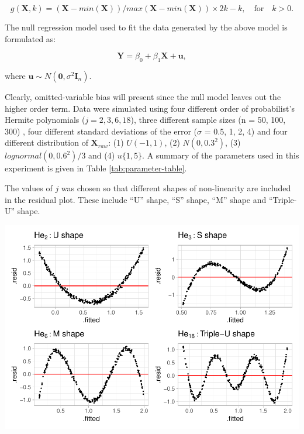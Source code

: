 \documentclass[]{interact}
\theoremstyle{plain}%
\theoremstyle{definition}
\theoremstyle{remark}
\begin{document}
\begin{equation} \label{eq:scaling-function}
g(\boldsymbol{X}, k) = (\boldsymbol{X} - min(\boldsymbol{X}))/max(\boldsymbol{X} - min(\boldsymbol{X})) \times 2k - k, \quad \text{for} \quad k > 0. 
\end{equation}

The null regression model used to fit the data generated by the above
model is formulated as:

\begin{equation} \label{eq:scaling-function}
\boldsymbol{Y} = \beta_0 + \beta_1 \boldsymbol{X} + \boldsymbol{u},
\end{equation}

where
\(\boldsymbol{u} \sim N(\boldsymbol{0}, \sigma^2\boldsymbol{I}_n)\).

Clearly, omitted-variable bias will present since the null model leaves
out the higher order term. Data were simulated using four different
order of probabilist's Hermite polynomials (\(j = 2, 3, 6, 18\)), three
different sample sizes (n = 50, 100, 300) , four different standard
deviations of the error (\(\sigma\) = 0.5, 1, 2, 4) and four different
distribution of \(\boldsymbol{X}_{raw}\): (1) \(U(-1, 1)\), (2)
\(N(0, 0.3^2)\), (3) \(lognormal(0, 0.6^2)/3\) and (4) \(u\{1, 5\}\). A
summary of the parameters used in this experiment is given in Table
\ref{tab:parameter-table}.

The values of \(j\) was chosen so that different shapes of non-linearity
are included in the residual plot. These include ``U'' shape, ``S''
shape, ``M'' shape and ``Triple-U'' shape.

\includegraphics{paper_comparison_files/figure-latex/different-shape-of-herimite-1.pdf}
\end{document}
